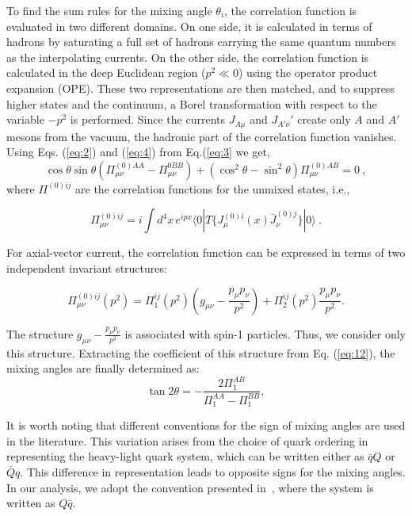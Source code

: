 \documentclass[prd,a4paper,preprint,preprintnumbers,nofootinbib,superscriptaddress]{revtex4-2}
\begin{document}
To find the sum rules for the mixing angle \(\theta_i\), the correlation function is evaluated in two different domains. On one side, it is calculated in terms of hadrons by saturating a full set of hadrons carrying the same quantum numbers as the interpolating currents. On the other side, the correlation function is calculated in the deep Euclidean region (\(p^2 \ll 0\)) using the operator product expansion (OPE). These two representations are then matched, and to suppress higher states and the continuum, a Borel transformation with respect to the variable \(-p^2\) is performed. Since the currents \(J_{A \mu}\) and \(J_{A' \nu}'\) create only $A$ and $A'$ mesons from the vacuum, the hadronic part of the correlation function vanishes. Using Eqs. (\ref{eq:2}) and (\ref{eq:4}) from Eq.(\ref{eq:3} we get, 
\begin{equation}
  \label{eq:12}
  \cos{\theta} \sin{\theta} ( \Pi_{\mu \nu}^{(0)AA} - \Pi_{\mu \nu}^{0BB}) + (\cos^2{\theta}  - \sin^2{\theta}) \Pi_{\mu \nu}^{(0)AB} = 0~,
\end{equation}
%
where \(\Pi^{(0) i j}\) are the correlation functions for the unmixed states, i.e.,

\begin{equation}
\Pi_{\mu\nu}^{(0) i j} = i \int d^4x \, e^{ipx} \langle 0 | T \{ J_\mu^{(0)i}(x) \bar{J}_{\nu}^{(0)j} \} | 0 \rangle~.
\end{equation}

For axial-vector current, the correlation function can be expressed in terms of two independent invariant structures:

\begin{equation}
  \label{eq:6}
  \Pi_{\mu \nu}^{(0) i j }(p^2) = \Pi_1^{i j} (p^2) \left( g_{\mu \nu} - \frac{p_\mu p_\nu}{p^2} \right) + \Pi_2^{ i j} (p^2) \frac{p_\mu p_\nu}{p^2}.
\end{equation}

The structure \( g_{\mu \nu} - \frac{p_\mu p_\nu}{p^2} \) is associated with spin-1 particles. Thus,  we consider only this structure. Extracting  the coefficient of this structure from Eq. (\ref{eq:12}), the mixing angles are finally determined as: 
%
\begin{equation}
  \label{eq:5}
  \tan{2 \theta} = - \frac{2 \Pi_1^{ AB }}{\Pi_1^{AA} - \Pi_1^{BB}},
\end{equation}

It is worth noting that different conventions for the sign of mixing angles are used in the literature. This variation arises from the choice of quark ordering in representing the heavy-light quark system, which can be written either as \( \bar{q}Q \) or \( \bar{Q}q \). This difference in representation leads to opposite signs for the mixing angles. In our analysis, we adopt the convention presented in~\cite{Barnes:2002mu}, where the system is written as \( Q \bar{q} \).
\end{document}

